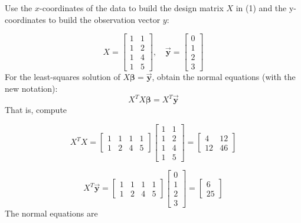 \documentclass[letter,11pt]{article}
\theoremstyle{definition}
\begin{document}
\begin{tcolorbox}[boxrule=1mm,enhanced jigsaw, breakable,before=\hfill,after=\hfill,adjusted title={Problem 6 solutions}]
\tcblower
Use the $x$-coordinates of the data to build the design matrix $X$ in (1) and
the y-coordinates to build the observation vector $y$:

\begin{equation*}
    X=\begin{bmatrix} 1 & 1\\ 1 & 2\\ 1 & 4\\ 1 & 5 \end{bmatrix}, \quad \vec{\boldsymbol{y}} =\begin{bmatrix} 0\\ 1\\2\\3 \end{bmatrix}
\end{equation*}
For the least-squares solution of $X\boldsymbol{\beta} = \vec{\boldsymbol{y}}$, obtain the normal equations (with the new
notation):
$$X^{T}X\boldsymbol{\beta} = X^{T}\vec{\boldsymbol{y}}$$
That is, compute 

$$X^{T}X = 
    \begin{bmatrix}
        1 & 1 & 1 & 1\\
        1 & 2 & 4 & 5
    \end{bmatrix}
    \begin{bmatrix} 
        1 & 1\\
        1 & 2\\
        1 & 4\\
        1 & 5
    \end{bmatrix} = 
    \begin{bmatrix} 
        4 & 12 \\
        12 & 46
    \end{bmatrix}$$

$$X^{T}\vec{\boldsymbol{y}} = 
    \begin{bmatrix}
        1 & 1 & 1 & 1\\
        1 & 2 & 4 & 5
    \end{bmatrix}
    \begin{bmatrix} 
       0\\ 1\\ 2\\ 3
    \end{bmatrix} = 
    \begin{bmatrix} 
        6 \\ 25
    \end{bmatrix}$$
The normal equations are


\end{tcolorbox}
\end{document}
